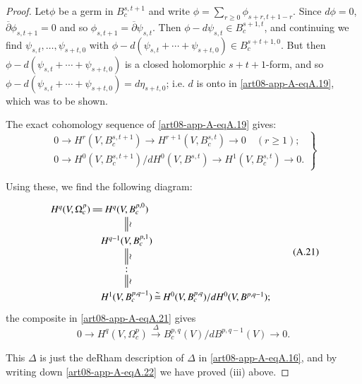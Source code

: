 \begin{proof}
Let\pageoriginale $\phi$ be a germ in $B^{s,t+1}_{c}$ and write $\phi=\sum\limits_{r\geq 0}\phi_{s+r,t+1-r}$. Since $d\phi=0$, $\overline{\partial}\phi_{s,t+1}=0$ and so $\phi_{s,t+1}=\overline{\partial}\psi_{s,t}$. Then $\phi-d\psi_{s,t}\in B^{s+1,t}_{c}$, and continuing we find $\psi_{s,t},\ldots,\psi_{s+t,0}$ with $\phi-d(\psi_{s,t}+\cdots+\psi_{s+t,0})\in B^{s+t+1,0}_{c}$. But then $\phi-d(\psi_{s,t}+\cdots+\psi_{s+t,0})$ is a closed holomorphic $s+t+1$-form, and so $\phi-d(\psi_{s,t}+\cdots+\psi_{s+t,0})=d\eta_{s+t,0}$; i.e. $d$ is onto in \eqref{art08-app-A-eqA.19}, which was to be shown.

The exact cohomology sequence of \eqref{art08-app-A-eqA.19} gives:
\begin{equation*}
\left.
\begin{array}{l}
0\to H^{r}(V,B^{s,t+1}_{c})\to H^{r+1}(V,B^{s,t}_{c})\to 0\quad (r\geq 1);\\
0\to H^{0}(V,B^{s,t+1}_{c})/dH^{0}(V,B^{s,t})\to H^{1}(V,B^{s,t}_{c})\to 0.
\end{array}\right\}\tag{A.20}\label{art08-app-A-eqA.20}
\end{equation*}

Using these, we find the following diagram:
\begin{equation*}
\vcenter{\xymatrix@C=.17cm@R=.5cm{
H^{q}(V,\Omega^{p}_{c})\ar@{=}[r] & H^{q}(V,B^{p,0}_{c})\ar@{=}[d]^-{\rotatebox{90}{$\sim$}} & \\
 & H^{q-1}(V,B^{p,1}_{c})\ar@{=}[d]^-{\rotatebox{90}{$\sim$}} & \\
 & :\ar@{=}[d]^-{\rotatebox{90}{$\sim$}} & \\
 & H^{1}(V,B^{p,q-1}_{c})\ar@{=}[r]^-{\sim} & H^{0}(V,B^{p,q}_{c})/dH^{0}(V,B^{p,q-1}); 
}}\tag{A.21}\label{art08-app-A-eqA.21}
\end{equation*}
the composite in \eqref{art08-app-A-eqA.21} gives
\begin{equation*}
0\to H^{q}(V,\Omega^{p}_{c})\xrightarrow{\Delta}B^{p,q}_{c}(V)/dB^{p,q-1}(V)\to 0.\tag{A.22}\label{art08-app-A-eqA.22}
\end{equation*}

This $\Delta$ is just the deRham description of $\Delta$ in \eqref{art08-app-A-eqA.16}, and by writing down \eqref{art08-app-A-eqA.22} we have proved (iii) above.
\end{proof}


